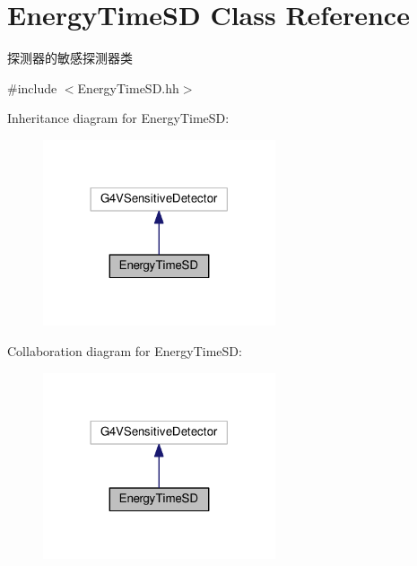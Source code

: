 \hypertarget{classEnergyTimeSD}{}\section{Energy\+Time\+SD Class Reference}
\label{classEnergyTimeSD}


探测器的敏感探测器类  




{\ttfamily \#include $<$Energy\+Time\+S\+D.\+hh$>$}



Inheritance diagram for Energy\+Time\+SD\+:\nopagebreak
\begin{figure}[H]
\begin{center}
\leavevmode
\includegraphics[width=194pt]{classEnergyTimeSD__inherit__graph}
\end{center}
\end{figure}


Collaboration diagram for Energy\+Time\+SD\+:\nopagebreak
\begin{figure}[H]
\begin{center}
\leavevmode
\includegraphics[width=194pt]{classEnergyTimeSD__coll__graph}
\end{center}
\end{figure}
